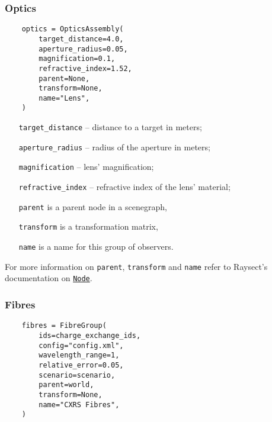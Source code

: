 \documentclass[../../main]{subfiles}
\begin{document}
\subsubsection{Optics}%
\label{sec:optics}

\begin{verbatim}
    optics = OpticsAssembly(
        target_distance=4.0,
        aperture_radius=0.05,
        magnification=0.1,
        refractive_index=1.52,
        parent=None,
        transform=None,
        name="Lens",
    )
\end{verbatim}

\begin{itemize}[align=left]
    \item[\texttt{target\_distance}] -- distance to a target in meters;
    \item[\texttt{aperture\_radius}] -- radius of the aperture in meters;
    \item[\texttt{magnification}] -- lens' magnification;
    \item[\texttt{refractive\_index}] -- refractive index of the lens' material;
    \item[\texttt{parent}] is a parent node in a scenegraph,
    \item[\texttt{transform}] is a transformation matrix,
    \item[\texttt{name}] is a name for this group of observers.
\end{itemize}

For more information on \texttt{parent}, \texttt{transform} and \texttt{name} refer to Raysect's documentation on \href{https://raysect.github.io/documentation/api_reference/edge/raysect_edge_scenegraph.html?highlight=node#raysect.edge.scenegraph.node.Node}{\texttt{Node}}.

\subsubsection{Fibres}%
\label{sec:fibres}

\begin{verbatim}
    fibres = FibreGroup(
        ids=charge_exchange_ids,
        config="config.xml",
        wavelength_range=1,
        relative_error=0.05,
        scenario=scenario,
        parent=world,
        transform=None,
        name="CXRS Fibres",
    )
\end{verbatim}
\end{document}
